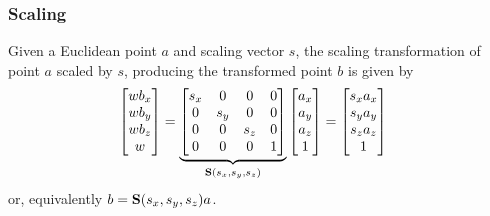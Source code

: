 \documentclass[11pt]{article}
\begin{document}
\begin{multicols}{2}
\subsubsection{Scaling}
Given a Euclidean point $a$ and scaling vector $s$, the scaling transformation
of point $a$ scaled by $s$, producing the transformed point $b$ is given by
\scriptsize
\begin{align}
    \begin{bmatrix}
        w b_x \\
        w b_y \\
        w b_z \\
        w
    \end{bmatrix}
    &=
    \underbrace{
    \begin{bmatrix}
        s_x     & 0     & 0     & 0 \\
        0       & s_y   & 0     & 0 \\
        0       & 0     & s_z   & 0 \\
        0       & 0     & 0     & 1 \\
    \end{bmatrix}}_{\text{\bf S}(s_x, s_y, s_z)}
    \begin{bmatrix}
        a_x \\
        a_y \\
        a_z \\
        1
    \end{bmatrix}
    =
    \begin{bmatrix}
        s_x a_x \\
        s_y a_y \\
        s_z a_z \\
        1
    \end{bmatrix}
\end{align}
\normalsize
or, equivalently $b = \text{\bf S}(s_x, s_y, s_z) a$.
\end{multicols}
\end{document}
